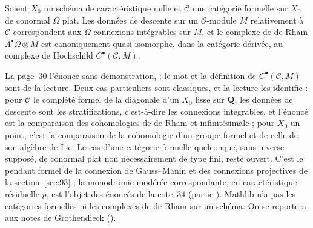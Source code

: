 \begin{encadre}
\begin{theoreme*}\nonverifie
Soient $X_0$ un schéma de caractéristique nulle et $\mathcal C$ une catégorie formelle sur $X_0$ de conormal $\Omega$ plat. Les données de descente sur un $\mathcal O$-module $M$ relativement à $\mathcal C$ correspondent aux $\Omega$-connexions intégrables sur $M$, et le complexe de de Rham $\Lambda^\bullet\Omega \otimes M$ est canoniquement quasi-isomorphe, dans la catégorie dérivée, au complexe de Hochschild $C^\bullet(\mathcal C, M)$.
\end{theoreme*}
\end{encadre}
{\small La page~30 l'énonce sans démonstration,  ; le mot  et la définition de $C^\bullet(\mathcal C, M)$ sont de la lecture. Deux cas particuliers sont classiques, et la lecture les identifie : pour $\mathcal C$ le complété formel de la diagonale d'un $X_0$ lisse sur $\mathbf Q$, les données de descente sont les stratifications, c'est-à-dire les connexions intégrables, et l'énoncé est la comparaison des cohomologies de de Rham et infinitésimale ; pour $X_0$ un point, c'est la comparaison de la cohomologie d'un groupe formel et de celle de son algèbre de Lie. Le cas d'une catégorie formelle quelconque, sans inverse supposé, de conormal plat non nécessairement de type fini, reste ouvert. C'est le pendant formel de la connexion de Gauss--Manin et des connexions projectives de la section~\ref{sec:93} ; la monodromie modérée correspondante, en caractéristique résiduelle $p$, est l'objet des énoncés de la cote~34 (partie ). Mathlib n'a pas les catégories formelles ni les complexes de de Rham sur un schéma. On se reportera aux notes de Grothendieck ().\par}

